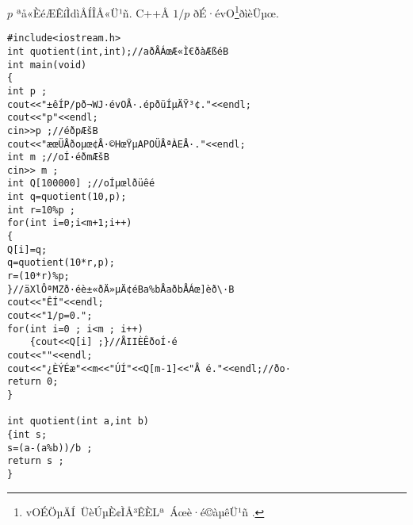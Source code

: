 \documentclass{jsarticle}
\theoremstyle{definition}
\begin{document}
$p$ ªå«­ÈéÆÊíÌdìÅÍÎÅ«Ü¹ñ. C++Å $1/p$ ð­É·évO\footnote{vOÉÖµÄÍ ÜèÚµ­È¢ÌÅ³ÊÈ\Lª Áœè·é©àµêÜ¹ñ
.}ðìèÜµœ.
\begin{verbatim}
#include<iostream.h>
int quotient(int,int);//aðÅÁœÆ«Ì€ðàÆßéB
int main(void)
{
int p ;
cout<<"±êÍP/pð¬WJ·évOÅ·.épðüÍµÄ­Ÿ³¢."<<endl;
cout<<"p"<<endl;
cin>>p ;//éðpÆš­B
cout<<"­æœÜÅðoµœ¢Å·©HœŸµAPOÜÅªÀEÅ·."<<endl;
int m ;//oÍ·éðmÆš­B
cin>> m ;
int Q[100000] ;//oÍµœlðüêé 
int q=quotient(10,p);
int r=10%p ;
for(int i=0;i<m+1;i++)
{
Q[i]=q;
q=quotient(10*r,p);
r=(10*r)%p;
}//äXlÔªMZð·éè±«ðÄ»µÄ¢éBa%bÅaðbÅÁœ]èð\·B
cout<<"ÊÍ"<<endl;
cout<<"1/p=0.";
for(int i=0 ; i<m ; i++)
	{cout<<Q[i] ;}//ÅIIÈÊðoÍ·é
cout<<""<<endl;
cout<<"¿ÈÝÉæ"<<m<<"ÚÍ"<<Q[m-1]<<"Å é."<<endl;//ðo·
return 0;
}

int quotient(int a,int b)
{int s;
s=(a-(a%b))/b ;
return s ;
}
\end{verbatim}
\newpage
\begin{center}
\end{center}
\end{document}

